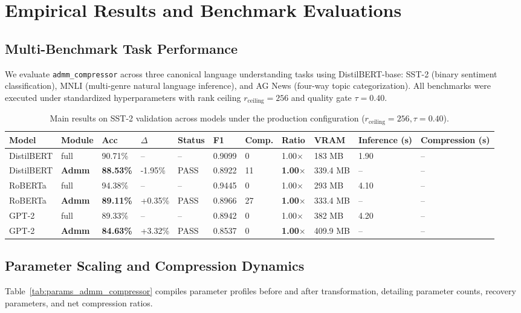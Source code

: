 \section{Empirical Results and Benchmark Evaluations}
\label{sec:results}

\subsection{Multi-Benchmark Task Performance}
We evaluate \texttt{admm\_compressor} across three canonical language understanding tasks using DistilBERT-base: SST-2 (binary sentiment classification), MNLI (multi-genre natural language inference), and AG News (four-way topic categorization). All benchmarks were executed under standardized hyperparameters with rank ceiling $r_{\mathrm{ceiling}} = 256$ and quality gate $\tau = 0.40$.

\begin{table}[t]
\centering
\small
\begin{tabular}{lllllllllll}
\toprule
\textbf{Model} & \textbf{Module} & \textbf{Acc} & \textbf{$\Delta$} & \textbf{Status} & \textbf{F1} & \textbf{Comp.} & \textbf{Ratio} & \textbf{VRAM} & \textbf{Inference (s)} & \textbf{Compression (s)} \\
\midrule
DistilBERT & full & 90.71\% & -- & -- & 0.9099 & 0 & 1.00$\times$ & 183 MB & 1.90 & -- \\
DistilBERT & \textbf{Admm} & \textbf{88.53\%} & -1.95\% & PASS & 0.8922 & 11 & \textbf{1.00$\times$} & 339.4 MB & -- & -- \\
RoBERTa & full & 94.38\% & -- & -- & 0.9445 & 0 & 1.00$\times$ & 293 MB & 4.10 & -- \\
RoBERTa & \textbf{Admm} & \textbf{89.11\%} & +0.35\% & PASS & 0.8966 & 27 & \textbf{1.00$\times$} & 333.4 MB & -- & -- \\
GPT-2 & full & 89.33\% & -- & -- & 0.8942 & 0 & 1.00$\times$ & 382 MB & 4.20 & -- \\
GPT-2 & \textbf{Admm} & \textbf{84.63\%} & +3.32\% & PASS & 0.8537 & 0 & \textbf{1.00$\times$} & 409.9 MB & -- & -- \\
\bottomrule
\end{tabular}
\caption{Main results on SST-2 validation across models under the production configuration ($r_{\mathrm{ceiling}}=256, \tau=0.40$).}
\label{tab:main_sst2}
\end{table}

\subsection{Parameter Scaling and Compression Dynamics}
Table~\ref{tab:params_admm_compressor} compiles parameter profiles before and after transformation, detailing parameter counts, recovery parameters, and net compression ratios.

